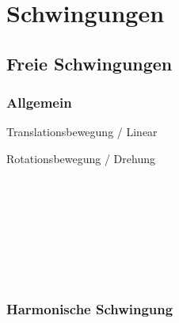 \section{Schwingungen}
\subsection{Freie Schwingungen}
\subsubsection{Allgemein}


\begin{center}
	\begin{minipage}{0.3\textwidth}
		Translationsbewegung / Linear \\
	\end{minipage}%
	\begin{minipage}{0.3\textwidth}
		Rotationsbewegung / Drehung \\
	\end{minipage}
\end{center}

\begin{center}
	\begin{minipage}{0.3\textwidth}
		 \\
		 \\
		 \\
	\end{minipage}%
	\begin{minipage}{0.3\textwidth}
		 \\
		 \\
		 \\
	\end{minipage}
\end{center}




\subsubsection{Harmonische Schwingung}

